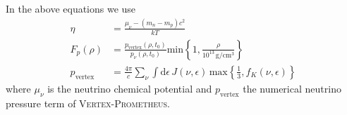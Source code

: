 \documentclass[fleqn,usenatbib]{mnras}
\newcommand{\vertexprom}{\textsc{Vertex-Prometheus}\xspace}
\begin{document}
In the above equations we use
\begin{align}
    \eta &= \frac{\mu_{\nu} - (m_n - m_p) c^2}{k T} \\
    F_p(\rho) &= \frac{p_\mathrm{vertex}(\rho,t_0)}{p_{\nu}(\rho,t_0)} \mathrm{min}\left\{ 1, \frac{\rho}{10^{13}\,\mathrm{g/cm^3}} \right\} \\
    p_\mathrm{vertex} &= \frac{4\pi}{c} \sum_{\nu} \int \mathrm{d}\epsilon \,
    J(\nu,\epsilon) \, \mathrm{max}\left\{ \frac{1}{3},  f_K(\nu,\epsilon) \right\}
\end{align}
where $\mu_{\nu}$ is the neutrino chemical potential and $p_{\mathrm{vertex}}$ the numerical neutrino pressure term of \vertexprom.

\newpage

\label{lastpage}
\end{document}
